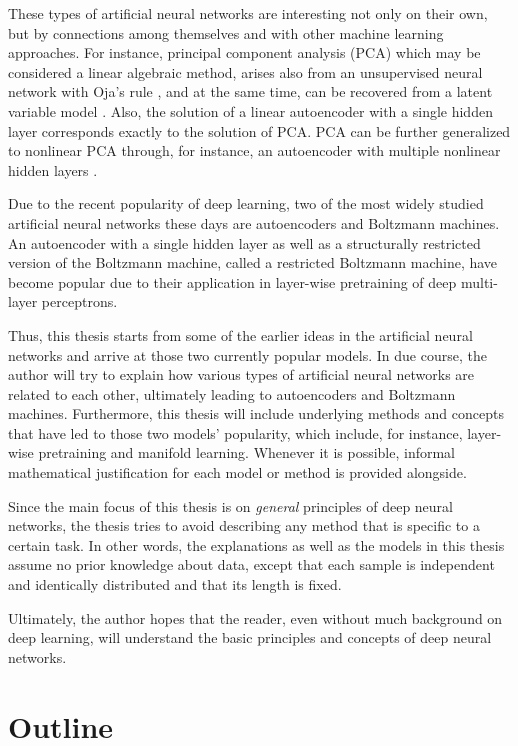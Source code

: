 \documentclass[dissertation,nocontribution,draft*]{aaltoseries}
\begin{document}
These types of artificial neural networks are interesting
not only on their own, but by connections among themselves
and with other machine learning approaches. For instance,
principal component analysis (PCA) which may be considered a
linear algebraic method, arises also from an unsupervised
neural network with Oja's rule \citep{Oja1982}, and at the
same time, can be recovered from a latent variable model
\citep{Tipping1999,Roweis1998}.  Also, the solution of a
linear autoencoder with a single hidden layer corresponds
exactly to the solution of PCA.  PCA can be further
generalized to nonlinear PCA through, for instance, an
autoencoder with multiple nonlinear hidden layers
\citep{Kramer1991}. 

Due to the recent popularity of deep learning, two of the
most widely studied artificial neural networks these days
are autoencoders and Boltzmann machines.  An autoencoder
with a single hidden layer as well as a structurally
restricted version of the Boltzmann machine, called a
restricted Boltzmann machine, have become popular due to
their application in layer-wise pretraining of deep
multi-layer perceptrons. 

Thus, this thesis starts from some of the earlier
ideas in the artificial neural networks and arrive at those
two currently popular models. In due course, the author will
try to explain how various types of artificial neural
networks are related to each other, ultimately leading to
autoencoders and Boltzmann machines. Furthermore, this
thesis will include underlying methods and concepts that
have led to those two models' popularity, which
include, for instance, layer-wise pretraining and manifold
learning. Whenever it is possible, informal mathematical
justification for each model or method is provided
alongside.

Since the main focus of this thesis is on \textit{general}
principles of deep neural networks, the thesis tries to
avoid describing any method that is specific to a certain
task. In other words, the explanations as well as the models
in this thesis assume no prior knowledge about data, except
that each sample is independent and identically distributed
and that its length is fixed. 

Ultimately, the author hopes that the reader, even without
much background on deep learning, will understand the basic
principles and concepts of deep neural networks. 


\section{Outline}
\end{document}
